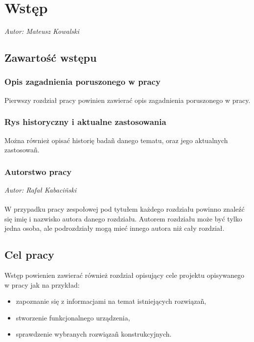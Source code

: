 \chapter{Wstęp}
\label{sec:wstep}
\textit{Autor: Mateusz Kowalski}

\section{Zawartość wstępu}
\label{sec:wstep:co}

\subsection{Opis zagadnienia poruszonego w pracy}
\sloppy
Pierwszy rozdział pracy powinien zawierać opis zagadnienia poruszonego w pracy.

\subsection{Rys historyczny i aktualne zastosowania}
\label{sec:wstep:rys}

Można również opisać historię badañ danego tematu, oraz jego aktualnych zastosowañ.

\subsection{Autorstwo pracy}
\textit{Autor: Rafał Kabaciñski}\\ \\
W przypadku pracy zespołowej pod tytułem każdego rozdziału powinno znaleźć się imię i nazwisko autora danego rozdziału. Autorem rozdziału może być tylko jedna osoba, ale podrozdziały mogą mieć innego autora niż cały rozdział. 

\section{Cel pracy}
\label{sec:wstep:cel}

	Wstęp powienien zawierać również rozdział opisujący cele projektu opisywanego w pracy jak na przykład:
	
\begin{itemize}
	\item zapoznanie się z informacjami na temat istniejących rozwiązañ,
	\item stworzenie funkcjonalnego urządzenia,
	\item sprawdzenie wybranych rozwiązañ konstrukcyjnych.
\end{itemize}

